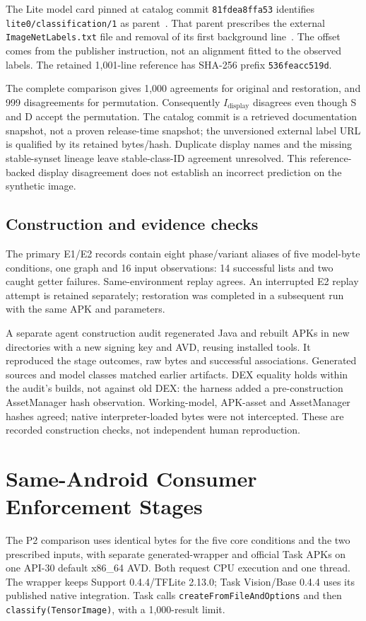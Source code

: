 \documentclass[10pt,conference]{IEEEtran}
\newcommand{\code}[1]{\texttt{#1}}
\begin{document}
The Lite model card pinned at catalog commit \code{81fdea8ffa53} identifies \code{lite0/classification/1} as parent~\cite{tfhub-lite-card}. That parent prescribes the external \code{ImageNetLabels.txt} file and removal of its first background line~\cite{tfhub-parent-card,imagenet-display}. The offset comes from the publisher instruction, not an alignment fitted to the observed labels. The retained 1,001-line reference has SHA-256 prefix \code{536feacc519d}.

The complete comparison gives 1,000 agreements for original and restoration, and 999 disagreements for permutation. Consequently $I_{\mathrm{display}}$ disagrees even though S and D accept the permutation. The catalog commit is a retrieved documentation snapshot, not a proven release-time snapshot; the unversioned external label URL is qualified by its retained bytes/hash. Duplicate display names and the missing stable-synset lineage leave stable-class-ID agreement unresolved. This reference-backed display disagreement does not establish an incorrect prediction on the synthetic image.

\subsection{Construction and evidence checks}
The primary E1/E2 records contain eight phase/variant aliases of five model-byte conditions, one graph and 16 input observations: 14 successful lists and two caught getter failures. Same-environment replay agrees. An interrupted E2 replay attempt is retained separately; restoration was completed in a subsequent run with the same APK and parameters.

A separate agent construction audit regenerated Java and rebuilt APKs in new directories with a new signing key and AVD, reusing installed tools. It reproduced the stage outcomes, raw bytes and successful associations. Generated sources and model classes matched earlier artifacts. DEX equality holds within the audit's builds, not against old DEX: the harness added a pre-construction AssetManager hash observation. Working-model, APK-asset and AssetManager hashes agreed; native interpreter-loaded bytes were not intercepted. These are recorded construction checks, not independent human reproduction.

\section{Same-Android Consumer Enforcement Stages}
\label{sec:consumers}
The P2 comparison uses identical bytes for the five core conditions and the two prescribed inputs, with separate generated-wrapper and official Task APKs on one API-30 default x86\_64 AVD. Both request CPU execution and one thread. The wrapper keeps Support 0.4.4/TFLite 2.13.0; Task Vision/Base 0.4.4 uses its published native integration. Task calls \code{createFromFileAndOptions} and then \code{classify(TensorImage)}, with a 1,000-result limit.
\end{document}
